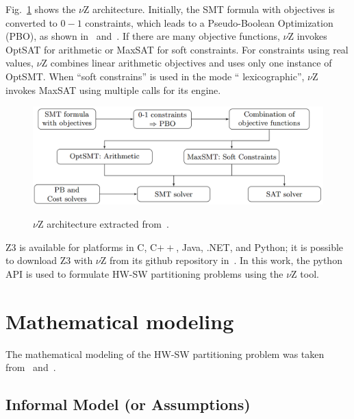 \documentclass{doublecol-new}
\theoremstyle{TH}{
\newtheorem{lemma}{Lemma}
\newtheorem{theorem}[lemma]{Theorem}
\newtheorem{corrolary}[lemma]{Corrolary}
\newtheorem{conjecture}[lemma]{Conjecture}
\newtheorem{proposition}[lemma]{Proposition}
\newtheorem{claim}[lemma]{Claim}
\newtheorem{stheorem}[lemma]{Wrong Theorem}
\newtheorem{algorithm}{Algorithm}
}
\theoremstyle{THrm}{
\newtheorem{definition}{Definition}[section]
\newtheorem{question}{Question}[section]
\newtheorem{remark}{Remark}
\newtheorem{scheme}{Scheme}
}
\theoremstyle{THhit}{
\newtheorem{case}{Case}[section]
}
\begin{document}
\vspace{2 mm}
Fig.~\ref{vZ-Architecture} shows the $\nu$Z architecture. Initially, the SMT formula with objectives is converted to $0-1$ constraints, which leads to a Pseudo-Boolean Optimization (PBO), as shown in~\cite{Barth1995} and~\cite{Vasco2005}. If there are many objective functions, $\nu$Z invokes OptSAT for arithmetic or MaxSAT for soft constraints. For constraints using real values, $\nu$Z combines linear arithmetic objectives and uses only one instance of OptSMT. When ``soft constrains'' is used in the mode `` lexicographic'', $\nu$Z invokes MaxSAT using multiple calls for its engine.

\begin{figure}[ht]
	\caption{$\nu$Z architecture extracted from~\cite{Bjorner2015}.}
	\centering
	\includegraphics[scale=0.21]{figures/vzArch.png} 
	\label{vZ-Architecture}
\end{figure}

Z3 is available for platforms in C, C$++$, Java, .NET, and Python; it is possible to download Z3 with $\nu$Z from its github repository in~\cite{Z3API}. In this work, the python API is used to formulate HW-SW partitioning problems using the $\nu$Z tool. 

\section{Mathematical modeling}
\label{Mathematical-modeling}

The mathematical modeling of the HW-SW partitioning problem was taken from~\cite{Arato2003} and~\cite{Mann2007}.

\subsection{Informal Model (or Assumptions)}
\label{Informal-Model-or-Assumptions}
\end{document}
